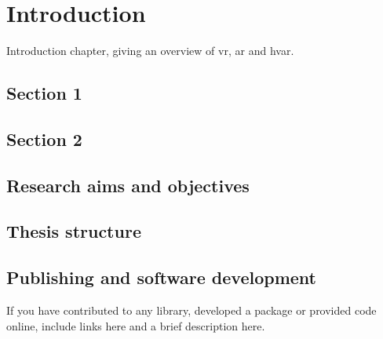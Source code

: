 \chapter{Introduction}
\label{ch:introduction}

Introduction chapter, giving an overview of \acrfull{vr}, \acrfull{ar} and \acrfull{hvar}. 

\section{Section 1}

\section{Section 2}

\section{Research aims and objectives}

\section{Thesis structure}

\section{Publishing and software development}

If you have contributed to any library, developed a package or provided code online, include links here and a brief description here.